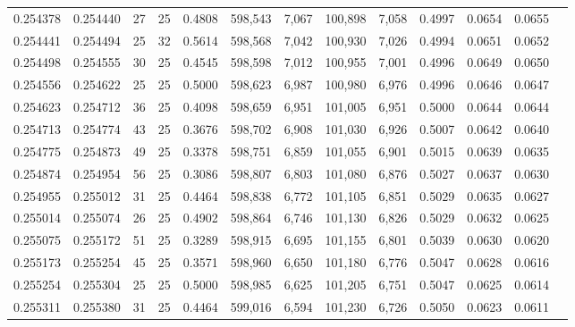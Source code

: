 \begin{tabular}{rrrrrrrrrrrrr}
0.254378 & 0.254440 &    27 &  25 &                                     0.4808 & 598,543 &   7,067 & 100,898 &   7,058 & 0.4997 & 0.0654 & 0.0655 \\
0.254441 & 0.254494 &    25 &  32 &                                     0.5614 & 598,568 &   7,042 & 100,930 &   7,026 & 0.4994 & 0.0651 & 0.0652 \\
0.254498 & 0.254555 &    30 &  25 &                                     0.4545 & 598,598 &   7,012 & 100,955 &   7,001 & 0.4996 & 0.0649 & 0.0650 \\
0.254556 & 0.254622 &    25 &  25 &                                     0.5000 & 598,623 &   6,987 & 100,980 &   6,976 & 0.4996 & 0.0646 & 0.0647 \\
0.254623 & 0.254712 &    36 &  25 &                                     0.4098 & 598,659 &   6,951 & 101,005 &   6,951 & 0.5000 & 0.0644 & 0.0644 \\
0.254713 & 0.254774 &    43 &  25 &                                     0.3676 & 598,702 &   6,908 & 101,030 &   6,926 & 0.5007 & 0.0642 & 0.0640 \\
0.254775 & 0.254873 &    49 &  25 &                                     0.3378 & 598,751 &   6,859 & 101,055 &   6,901 & 0.5015 & 0.0639 & 0.0635 \\
0.254874 & 0.254954 &    56 &  25 &                                     0.3086 & 598,807 &   6,803 & 101,080 &   6,876 & 0.5027 & 0.0637 & 0.0630 \\
0.254955 & 0.255012 &    31 &  25 &                                     0.4464 & 598,838 &   6,772 & 101,105 &   6,851 & 0.5029 & 0.0635 & 0.0627 \\
0.255014 & 0.255074 &    26 &  25 &                                     0.4902 & 598,864 &   6,746 & 101,130 &   6,826 & 0.5029 & 0.0632 & 0.0625 \\
0.255075 & 0.255172 &    51 &  25 &                                     0.3289 & 598,915 &   6,695 & 101,155 &   6,801 & 0.5039 & 0.0630 & 0.0620 \\
0.255173 & 0.255254 &    45 &  25 &                                     0.3571 & 598,960 &   6,650 & 101,180 &   6,776 & 0.5047 & 0.0628 & 0.0616 \\
0.255254 & 0.255304 &    25 &  25 &                                     0.5000 & 598,985 &   6,625 & 101,205 &   6,751 & 0.5047 & 0.0625 & 0.0614 \\
0.255311 & 0.255380 &    31 &  25 &                                     0.4464 & 599,016 &   6,594 & 101,230 &   6,726 & 0.5050 & 0.0623 & 0.0611 \\

\end{tabular}
